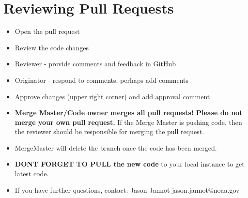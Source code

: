 \documentclass[
  letterpaper,
  DIV=11,
  numbers=noendperiod]{scrreprt}
\providecommand{\tightlist}{%
  \setlength{\itemsep}{0pt}\setlength{\parskip}{0pt}}\usepackage{longtable,booktabs,array}
\begin{document}
\section{Reviewing Pull Requests}\label{reviewing-pull-requests}

\begin{itemize}
\tightlist
\item
  Open the pull request
\item
  Review the code changes
\item
  Reviewer - provide comments and feedback in GitHub
\item
  Originator - respond to comments, perhaps add comments
\item
  Approve changes (upper right corner) and add approval comment
\item
  \textbf{Merge Master/Code owner merges all pull requests! Please do
  not merge your own pull request.} If the Merge Master is pushing code,
  then the reviewer should be responsible for merging the pull request.
\item
  MergeMaster will delete the branch once the code has been merged.
\item
  \textbf{DONT FORGET TO PULL the new code} to your local instance to
  get latest code.
\end{itemize}

\begin{itemize}
\tightlist
\item
  If you have further questions, contact: Jason Jannot
  jason.jannot@noaa.gov
\end{itemize}
\end{document}
